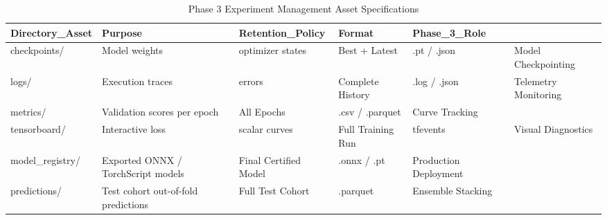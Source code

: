 \begin{table}
\caption{Phase 3 Experiment Management Asset Specifications}
\begin{tabular}{lllll}
\toprule
Directory_Asset & Purpose & Retention_Policy & Format & Phase_3_Role \\
\midrule
checkpoints/ & Model weights & optimizer states & Best + Latest & .pt / .json & Model Checkpointing \\
logs/ & Execution traces & errors & Complete History & .log / .json & Telemetry Monitoring \\
metrics/ & Validation scores per epoch & All Epochs & .csv / .parquet & Curve Tracking \\
tensorboard/ & Interactive loss & scalar curves & Full Training Run & tfevents & Visual Diagnostics \\
model_registry/ & Exported ONNX / TorchScript models & Final Certified Model & .onnx / .pt & Production Deployment \\
predictions/ & Test cohort out-of-fold predictions & Full Test Cohort & .parquet & Ensemble Stacking \\
\bottomrule
\end{tabular}
\end{table}
